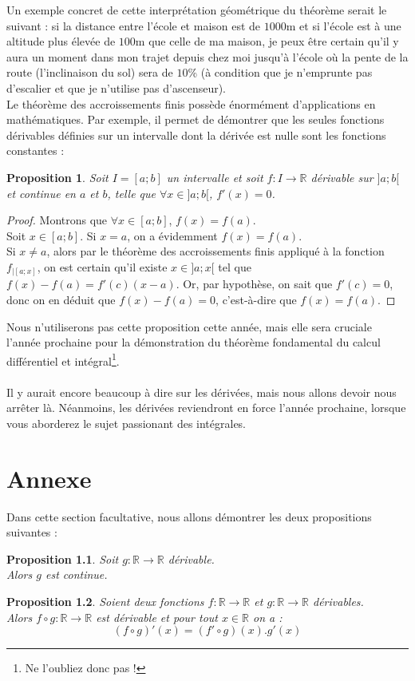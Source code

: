 \documentclass[a4paper,fontsize=13pt]{scrreprt}
\theoremstyle{plain}
\newtheorem{pro}[subsection]{Proposition}
\newtheorem*{pro*}{Proposition}
\theoremstyle{definition}
\newcommand{\rr}{\mathbb{R}}
\begin{document}
Un exemple concret de cette interprétation géométrique du théorème serait le suivant : si la distance entre l'école et maison est de $1000$m et si l'école est à une altitude plus élevée de $100$m que celle de ma maison, je peux être certain qu'il y aura un moment dans mon trajet depuis chez moi jusqu'à l'école où la pente de la route (l'inclinaison du sol) sera de $10$\% (à condition que je n'emprunte pas d'escalier et que je n'utilise pas d'ascenseur). \\
Le théorème des accroissements finis possède énormément d'applications en mathématiques. Par exemple, il permet de démontrer que les seules fonctions dérivables définies sur un intervalle dont la dérivée est nulle sont les fonctions constantes :
\begin{pro}
Soit $I=[a;b]$ un intervalle et soit $f:I\to \rr$ dérivable sur $]a;b[$ et continue en $a$ et $b$, telle que $\forall x \in ]a;b[$, $f'(x)=0$.
\end{pro}
\begin{proof}
Montrons que $\forall x \in [a;b]$, $f(x)=f(a)$. \\
Soit $x \in [a;b]$. Si $x =a$, on a évidemment $f(x)=f(a)$. \\
Si $x \neq a$, alors par le théorème des accroissements finis appliqué à la fonction $f_{|[a;x]}$, on est certain qu'il existe $x \in ]a;x[$ tel que $f(x)-f(a)=f'(c)(x-a)$. Or, par hypothèse, on sait que $f'(c)=0$, donc on en déduit que $f(x)-f(a)=0$, c'est-à-dire que $f(x)=f(a)$.
\end{proof}
Nous n'utiliserons pas cette proposition cette année, mais elle sera cruciale l'année prochaine pour la démonstration du théorème fondamental du calcul différentiel et intégral\footnote{Ne l'oubliez donc pas !}.\\
~~\\
Il y aurait encore beaucoup à dire sur les dérivées, mais nous allons devoir nous arrêter là. Néanmoins, les dérivées reviendront en force l'année prochaine, lorsque vous aborderez le sujet passionant des intégrales.

\chapter{Annexe}

Dans cette section facultative, nous allons démontrer les deux propositions suivantes :

\begin{pro*}
	Soit $g : \rr \to \rr$ dérivable. \\
Alors $g$ est continue.
\end{pro*}
\begin{pro*}
	Soient deux fonctions $f : \rr \to \rr$ et $g : \rr \to \rr$ dérivables. \\
Alors $f \circ g : \rr \to \rr$ est dérivable et pour tout $x \in \rr$ on a :
$$(f \circ g)'(x) = (f' \circ g)(x).g'(x)$$
\end{pro*}
\end{document}

